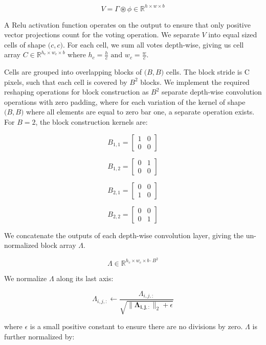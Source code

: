 \documentclass{article}
\begin{document}
\[
V = \Gamma \circledast \phi \in \mathbb{R}^{h\times w \times b}
\]


 A Relu activation function operates on the output to ensure that only positive vector projections count for the voting operation. 
 We separate \(V\) into equal sized cells of shape \(\big(c, c \big)\). For each cell, we sum all votes depth-wise, giving us cell array \(C \in \mathbb{R}^{h_c\times w_c \times b}\) where \( h_c=\frac{h}{c} \text{ and } w_c=\frac{w}{c}\).  
 
 Cells are grouped into overlapping blocks of \(\big(B, B \big)\) cells. The block stride is C pixels, such that each cell is covered by \(B^2\) blocks. We implement the required reshaping operations for block construction as \(B^2\) separate depth-wise convolution operations with zero padding, where for each variation of the kernel of shape \(\big(B, B \big)\) where all elements are equal to zero bar one, a separate operation exists. For \(B=2\), the block construction kernels are:
 
 \[
B_{1, 1} = \begin{bmatrix} 
1 & 0  \\
0 & 0  
\end{bmatrix}
\]

 \[
B_{1, 2} = \begin{bmatrix} 
0 & 1  \\
0 & 0  
\end{bmatrix}
\]
 
  \[
B_{2, 1} = \begin{bmatrix} 
0 & 0  \\
1 & 0  
\end{bmatrix}
\]

\[
B_{2, 2} = \begin{bmatrix} 
0 & 0  \\
0 & 1  
\end{bmatrix}
\]

We concatenate the outputs of each depth-wise convolution layer, giving the un-normalized block array \(\Lambda\).

\[
\Lambda \in \mathbb{R}^{h_c\times w_c \times b \cdot B^2}
\]
 

 We normalize \(\Lambda\) along its last axis:

\[
\Lambda_{i, j, :}
\leftarrow 
\frac{\Lambda_{i, j, :}}{\sqrt{\lVert \mathbf{\Lambda_{i, j, :}} \rVert_2 + \epsilon}}


\]

where \(\epsilon\) is a small positive constant to ensure there are no divisions by zero. \(\Lambda\) is further normalized by:
\end{document}
